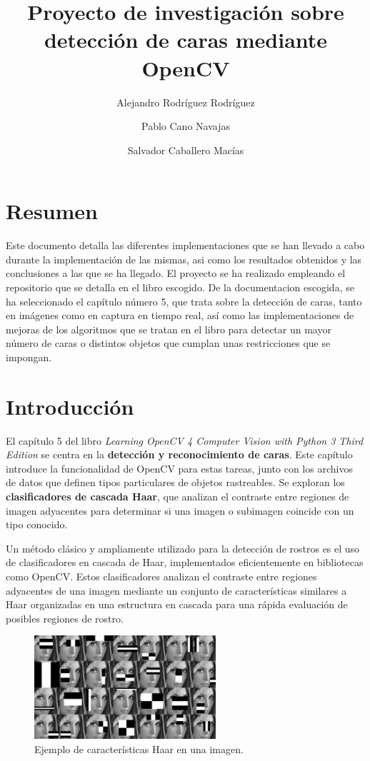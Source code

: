 \documentclass[a4paper]{article}
\title{Proyecto de investigación sobre detección de caras mediante OpenCV}
\author{Alejandro Rodríguez Rodríguez \and Pablo Cano Navajas \and Salvador Caballero Macías}
\begin{document}
\maketitle

\newpage
\tableofcontents

\newpage
\section*{Resumen}

Este documento detalla las diferentes implementaciones que se han llevado a cabo durante la implementación de las mismas, asi como los resultados obtenidos y las conclusiones a las que se ha llegado. El proyecto se ha realizado empleando el repositorio\cite{1} que se detalla en el libro escogido\cite{2}.
De la documentacion escogida, se ha seleccionado el capítulo número 5, que trata sobre la detección de caras, tanto en imágenes como en captura en tiempo real, así como las implementaciones de mejoras de los algoritmos que se tratan en el libro para detectar un mayor número de caras o distintos objetos que cumplan unas restricciones que se impongan.

\section{Introducción}

El capítulo 5 del libro \textit{Learning OpenCV 4 Computer Vision with Python 3 Third Edition} \cite{2} se centra en la \textbf{detección y reconocimiento de caras}. Este capítulo introduce la funcionalidad de OpenCV para estas tareas, junto con los archivos de datos que definen tipos particulares de objetos rastreables. Se exploran los \textbf{clasificadores de cascada Haar}, que analizan el contraste entre regiones de imagen adyacentes para determinar si una imagen o subimagen coincide con un tipo conocido.

Un método clásico y ampliamente utilizado
para la detección de rostros es el uso de clasificadores en cascada de Haar,
implementados eficientemente en bibliotecas como OpenCV. Estos clasificadores
analizan el contraste entre regiones adyacentes de una imagen mediante un
conjunto de características similares a Haar organizadas en una estructura en
cascada para una rápida evaluación de posibles regiones de rostro. 
\begin{figure}[h!]
    \centering
    \includegraphics[width=0.6\textwidth]{../img/haar_cascade.png}
    \caption{Ejemplo de características Haar en una imagen.}
\end{figure}
\end{document}
